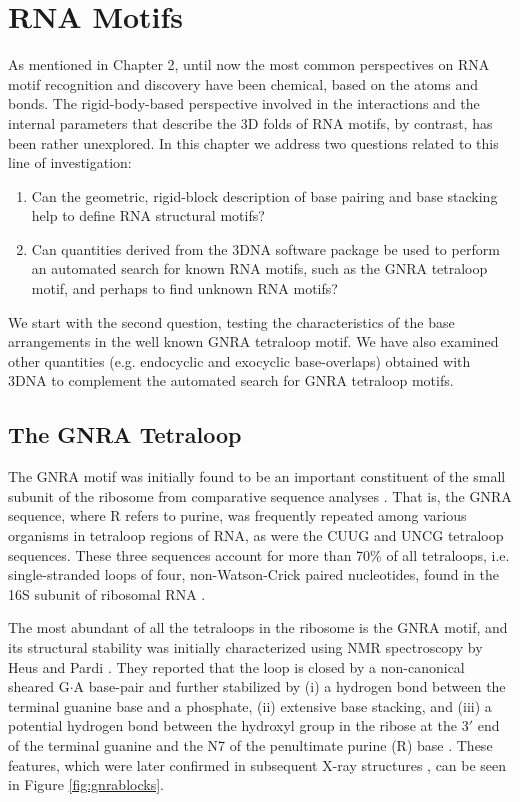 \chapter{RNA Motifs}
\label{motifs} 

As mentioned  in Chapter 2, until  now the most  common perspectives on
RNA motif recognition  and discovery have been chemical,  based on the
atoms  and bonds.  The  rigid-body-based  perspective involved  in the
interactions and the internal parameters that describe the 3D folds of
RNA motifs, by contrast, has  been rather unexplored.  In this chapter
we address two questions related to this line of investigation:

\begin{enumerate}
\item{Can the  geometric, rigid-block description of  base pairing and
  base stacking help to define RNA structural motifs?}
\item{Can quantities derived from the 3DNA software package be used to
  perform an automated search for  known RNA motifs, such as the GNRA
  tetraloop motif, and perhaps to find unknown RNA motifs?}
\end{enumerate}

We start with the second  question, testing the characteristics of the
base arrangements  in the  well known GNRA  tetraloop motif.   We have
also  examined  other   quantities  (e.g.   endocyclic  and  exocyclic
base-overlaps) obtained with 3DNA \cite{lu2003, lu2008b} to complement
the automated search for GNRA tetraloop motifs.

\section{The GNRA Tetraloop}
The GNRA motif  was initially found to be  an important constituent of
the small  subunit of the ribosome from  comparative sequence analyses
\cite{woese1990}.   That is,  the  GNRA sequence,  where  R refers  to
purine, was  frequently repeated among various  organisms in tetraloop
regions of RNA,  as were the CUUG and  UNCG tetraloop sequences. These
three sequences  account for  more than 70\%  of all  tetraloops, i.e.
single-stranded  loops of  four, non-Watson-Crick  paired nucleotides,
found   in  the   16S  subunit   of  ribosomal   RNA  \cite{woese1990,
  depaul2010}.

The most  abundant of all the  tetraloops in the ribosome  is the GNRA
motif, and its structural  stability was initially characterized using
NMR  spectroscopy by  Heus and  Pardi \cite{heus1991}.   They reported
that the loop is closed by a non-canonical sheared G$\cdot$A base-pair
and further  stabilized by  (i) a hydrogen  bond between  the terminal
guanine base and a phosphate,  (ii) extensive base stacking, and (iii)
a potential hydrogen bond between  the hydroxyl group in the ribose at
the 3$'$  end of the  terminal guanine and  the N7 of  the penultimate
purine  (R) base  \cite{heus1991}.  These  features, which  were later
confirmed in subsequent X-ray structures \cite{pley1994b}, can be seen
in Figure \ref{fig:gnrablocks}.

